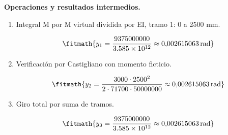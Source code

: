 \noindent\textbf{Operaciones y resultados intermedios.}

\begin{enumerate}

\item Integral M por M virtual dividida por EI, tramo 1: 0 a 2500 mm.

\[\fitmath{y_{1}=\frac{9375000000}{3.585\times10^{12}}\approx 0{,}002615063\,\mathrm{rad}}\]

\item Verificación por Castigliano con momento ficticio.

\[\fitmath{y_{2}=\frac{3000\cdot {2500}^{2}}{2\cdot 71700\cdot 50000000}\approx 0{,}002615063\,\mathrm{rad}}\]

\item Giro total por suma de tramos.

\[\fitmath{y_{3}=\frac{9375000000}{3.585\times10^{12}}\approx 0{,}002615063\,\mathrm{rad}}\]

\end{enumerate}
